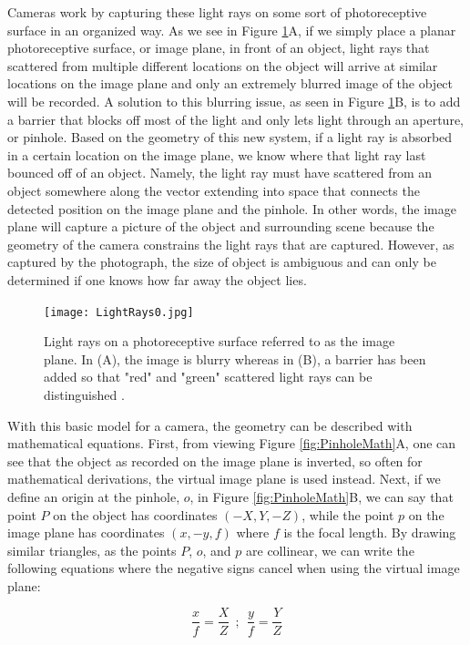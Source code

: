 Cameras work by capturing these light rays on some sort of photoreceptive surface in an organized way. As we see in Figure \ref{fig:LightRays}A, if we simply place a planar photoreceptive surface, or image plane, in front of an object, light rays that scattered from multiple different locations on the object will arrive at similar locations on the image plane and only an extremely blurred image of the object will be recorded. A solution to this blurring issue, as seen in Figure \ref{fig:LightRays}B, is to add a barrier that blocks off most of the light and only lets light through an aperture, or pinhole. Based on the geometry of this new system, if a light ray is absorbed in a certain location on the image plane, we know where that light ray last bounced off of an object. Namely, the light ray must have scattered from an object somewhere along the vector extending into space that connects the detected position on the image plane and the pinhole. In other words, the image plane will capture a picture of the object and surrounding scene because the geometry of the camera constrains the light rays that are captured. However, as captured by the photograph, the size of object is ambiguous and can only be determined if one knows how far away the object lies.

\begin{figure}
\centering
\texttt{[image: LightRays0.jpg]}
\caption{Light rays on a photoreceptive surface referred to as the image plane. In (A), the image is blurry whereas in (B), a barrier has been added so that "red" and "green" scattered light rays can be distinguished  \cite{FP}.}
\label{fig:LightRays}
\end{figure}

With this basic model for a camera, the geometry can be described with mathematical equations. First, from viewing Figure \ref{fig:PinholeMath}A, one can see that the object as recorded on the image plane is inverted, so often for mathematical derivations, the virtual image plane is used instead. Next, if we define an origin at the pinhole, $o$, in Figure \ref{fig:PinholeMath}B, we can say that point $P$ on the object has coordinates $(-X,Y,-Z)$, while the point $p$ on the image plane has coordinates $(x,-y,f)$ where $f$ is the focal length. By drawing similar triangles, as the points $P$, $o$, and $p$ are collinear, we can write the following equations where the negative signs cancel when using the virtual image plane:

$$\frac{x}{f}=\frac{X}{Z} \ \ ; \ \  \frac{y}{f}=\frac{Y}{Z}$$

